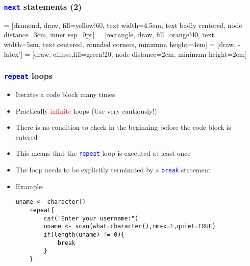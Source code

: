\documentclass[10pt]{beamer}
\newcommand{\cc}[1]{\texttt{\textcolor{blue}{#1}}}
\theoremstyle{definition}
\begin{document}
\begin{frame}[fragile]
\frametitle{\cc{next} statements (2)}
 = [diamond, draw, fill=yellow!60, 
    text width=4.5em, text badly centered, node distance=3cm, inner sep=0pt]
 = [rectangle, draw, fill=orange!40, 
    text width=5em, text centered, rounded corners, minimum height=4em]
 = [draw, -latex']
 = [draw, ellipse,fill=green!20, node distance=2cm,
    minimum height=2em]

\begin{center}
\end{center} 
\end{frame}

\begin{frame}[fragile]
\frametitle{\cc{repeat} loops}
\begin{itemize}
	\item Iterates a code block many times
	\item Practically \textcolor{red}{infinite} loops (Use very cautiously!)
	\item There is no condition to check in the beginning before the code block is entered
	\item This means that the \cc{repeat} loop is executed at least once
	\item The loop needs to be explicitly terminated by a \cc{break} statement
	\item Example:
	\begin{lstlisting}[style = rstyle, breaklines]
	uname <- character()
	repeat{
		cat("Enter your username:")
		uname <- scan(what=character(),nmax=1,quiet=TRUE)
		if(length(uname) != 0){
			break
		}
	}
	\end{lstlisting}
\end{itemize}
\end{frame}
\end{document}
